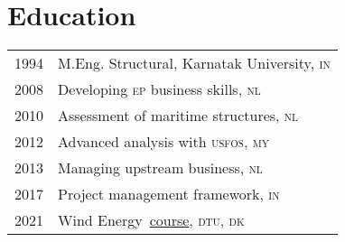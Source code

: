 \section*{Education} %
\label{sec:edu}

\begin{tabular}{l l}
  1994 & M.Eng. Structural, Karnatak University, \textsc{in} \\
  2008 & Developing \textsc{ep} business skills, \textsc{nl} \\
  2010 & Assessment of maritime structures, \textsc{nl} \\
  2012 & Advanced analysis with \textsc{usfos}, \textsc{my} \\
  2013 & Managing upstream business, \textsc{nl} \\
  2017 & Project management framework, \textsc{in} \\
  2021 & Wind Energy~\href{https://www.coursera.org/account/accomplishments/certificate/Y9CRZSXUSTWB}{course}, \textsc{dtu}, \textsc{dk} \\
\end{tabular}

